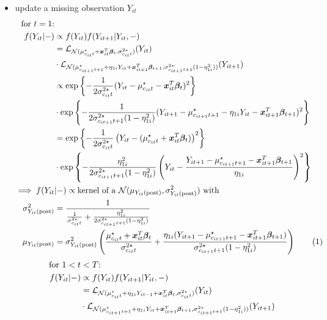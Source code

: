 \documentclass[12pt,	%
	a4paper,		%
	twoside,		%
	openright,		%
	titlepage,%
	]{book}
\theoremstyle{definition}
\begin{document}
\begin{itemize}
\item update a missing observation $Y_{it}$
\begin{align*}
\text{for $t=1$:}&\\ 
 f(Y_{it} |- ) & \propto  f(Y_{it})  f(Y_{it+1} | Y_{it}, - )\\
 & = \law_{\mathcal{N}(\mu^\star_{c_{it}t} + \vec{x}_{it}^T\vec{\beta}_t,\sigma^{2\star}_{c_{it}t})}(Y_{it}) \\& \cdot \law_{\mathcal{N}(\mu_{c_{it+1}t+1}^\star+\eta_{1i}Y_{it} + \vec{x}_{it+1}^T\vec{\beta}_{t+1},\sigma^{2\star}_{c_{it+1}t+1}(1-\eta_{1i}^2))}(Y_{it+1})\\
 & \propto \expp{-\frac{1}{2\sigma^{2\star}_{c_{it}t}}(Y_{it}-\mu^\star_{c_{it}t} - \vec{x}_{it}^T\vec{\beta}_t)^2} \\ & \cdot \expp{-\frac{1}{2\sigma^{2\star}_{c_{it+1}t+1}(1-\eta_{1i}^2)}(Y_{it+1}-\mu^\star_{c_{it+1}t+1} - \eta_{1i}Y_{it} - \vec{x}_{it+1}^T\vec{\beta}_{t+1})^2} \\ 
 & = \expp{-\frac{1}{2\sigma^{2\star}_{c_{it}t}}\left( Y_{it}-(\mu^\star_{c_{it}t} + \vec{x}_{it}^T\vec{\beta}_t) \right)^2} \\ & \cdot \expp{-\frac{\eta_{1i}^2}{2\sigma^{2\star}_{c_{it+1}t+1}(1-\eta_{1i}^2)}\left( Y_{it} - \frac{Y_{it+1}-\mu^\star_{c_{it+1}t+1} - \vec{x}_{it+1}^T\vec{\beta}_{t+1}}{\eta_{1i}}\right)^2} \\
%
 \implies f(Y_{it}&|-)\propto \text{kernel of a $\N(\mu_{\postp{Y_{it}}},\sigma^2_{\postp{Y_{it}}})$ with}\\
\sigma^2_{\postp{Y_{it}}}&= \frac{1}{\frac{1}{\sigma^{2\star}_{c_{it}t}} + \frac{\eta_{1i}^2}{2\sigma^{2\star}_{c_{it+1}t+1}(1-\eta_{1i}^2)}}\\
\mu_{\postp{Y_{it}}}&=  \sigma^2_{\postp{Y_{it}}} \left( \frac{\mu^\star_{c_{it}t} + \vec{x}_{it}^T\vec{\beta}_t}{\sigma^{2\star}_{c_{it}t}} + \frac{\eta_{1i}(Y_{it+1}-\mu^\star_{c_{it+1}t+1} - \vec{x}_{it+1}^T\vec{\beta}_{t+1})}{\sigma^{2\star}_{c_{it+1}t+1}(1-\eta_{1i}^2)} \right)
\tag{\stepcounter{equation}\theequation}
\end{align*}
\begin{align*}
\text{for } 1<t&<T\text{:}\\
 f(Y_{it} |- ) & \propto  f(Y_{it})  f(Y_{it+1} | Y_{it}, - )\\
 & = \law_{\mathcal{N}(\mu^\star_{c_{it}t} + \eta_{1i}Y_{it-1} + \vec{x}_{it}^T\vec{\beta}_t,\sigma^{2\star}_{c_{it}t})}(Y_{it}) \\& \cdot \law_{\mathcal{N}(\mu_{c_{it+1}t+1}^\star+\eta_{1i}Y_{it} + \vec{x}_{it+1}^T\vec{\beta}_{t+1},\sigma^{2\star}_{c_{it+1}t+1}(1-\eta_{1i}^2))}(Y_{it+1})\\

\end{align*}
\end{itemize}
\end{document}
